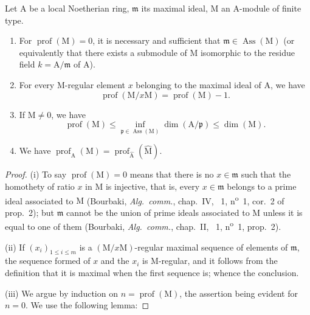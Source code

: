 \begin{proposition}[16.4.6]
\label{0.16.4.6}
Let $\mathrm{A}$ be a local Noetherian ring, $\mathfrak{m}$ its maximal ideal, $\mathrm{M}$ an $\mathrm{A}$-module of finite type.
\begin{enumerate}
  \item[\rm{(i)}] For $\operatorname{prof}(\mathrm{M})=0$, it is necessary and sufficient that $\mathfrak{m}\in\operatorname{Ass}(\mathrm{M})$ (or equivalently that there exists a submodule of $\mathrm{M}$ isomorphic to the residue field $k=\mathrm{A}/\mathfrak{m}$ of $\mathrm{A}$).
  \item[\rm{(ii)}] For every $\mathrm{M}$-regular element $x$ belonging to the maximal ideal of $\mathrm{A}$, we have
  \begin{equation}
  \label{0.16.4.6.1}
  \tag{16.4.6.1}
    \operatorname{prof}(\mathrm{M}/x\mathrm{M})=\operatorname{prof}(\mathrm{M})-1.
  \end{equation}
  \item[\rm{(iii)}] If $\mathrm{M}\neq 0$, we have
  \begin{equation}
  \label{0.16.4.6.2}
  \tag{16.4.6.2}
    \operatorname{prof}(\mathrm{M})\leq\inf_{\mathfrak{p}\in\operatorname{Ass}(\mathrm{M})}\dim(\mathrm{A}/\mathfrak{p})\leq\dim(\mathrm{M}).
  \end{equation}
  \item[\rm{(iv)}] We have $\operatorname{prof}_\mathrm{A}(\mathrm{M})=\operatorname{prof}_{\widehat{\mathrm{A}}}(\widehat{\mathrm{M}})$.
\end{enumerate}
\end{proposition}

\begin{proof}
(i) To say $\operatorname{prof}(\mathrm{M})=0$ means that there is no $x\in\mathfrak{m}$ such that the homothety of ratio $x$ in $\mathrm{M}$ is injective, that is, every $x\in\mathfrak{m}$ belongs to a prime ideal associated to $\mathrm{M}$ (Bourbaki, \emph{Alg.~comm.}, chap.~IV, \textsection~1, n\textsuperscript{o}~1, cor.~2 of prop.~2); but $\mathfrak{m}$ cannot be the union of prime ideals associated to $\mathrm{M}$ unless it is equal to one of them (Bourbaki, \emph{Alg.~comm.}, chap.~II, \textsection~1, n\textsuperscript{o}~1, prop.~2).

(ii) If $(x_i)_{1\leq i\leq m}$ is a $(\mathrm{M}/x\mathrm{M})$-regular maximal sequence of elements of $\mathfrak{m}$, the sequence formed of $x$ and the $x_i$ is $\mathrm{M}$-regular, and it follows from the definition that it is maximal when the first sequence is; whence the conclusion.

(iii) We argue by induction on $n=\operatorname{prof}(\mathrm{M})$, the assertion being evident for $n=0$.
We use the following lemma:
\end{proof}

